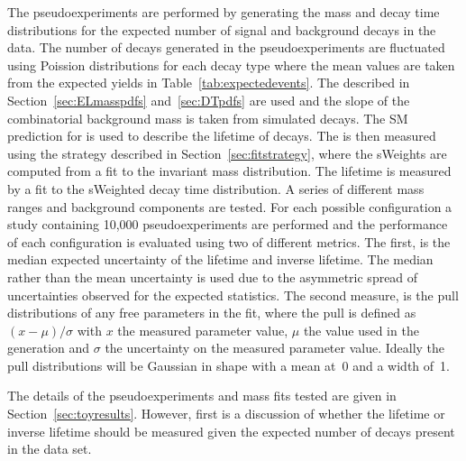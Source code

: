 {The pseudoexperiments are performed by generating the mass and decay time distributions for the expected number of signal and background decays in the data. The number of decays generated in the pseudoexperiments are fluctuated using Poission distributions for each decay type where the mean values are taken from the expected yields in Table~\ref{tab:expectedevents}. The \pdfs described in Section~\ref{sec:ELmasspdfs} and~\ref{sec:DTpdfs} are used and the slope of the combinatorial background mass \pdf is taken from simulated \bbbarmumux decays. The SM prediction for \tmumu is used to describe the lifetime of \bsmumu decays. %
The \el is then measured using the strategy described in Section~\ref{sec:fitstrategy}, where the sWeights are computed from a fit to the invariant mass distribution. The lifetime is measured by a fit to the sWeighted decay time distribution. A series of different mass ranges and background components are tested. For each possible configuration a study containing 10,000 pseudoexperiments are performed and the performance of each configuration is evaluated using two of different metrics. The first, is the median expected uncertainty of the \bsmumu lifetime and inverse lifetime. The median rather than the mean uncertainty is used due to the asymmetric spread of uncertainties observed for the expected statistics. The second measure, is the pull distributions of any free parameters in the fit, where the pull is defined as $(x - \mu)/\sigma$ with $x$ the measured parameter value, $\mu$ the value used in the generation and $\sigma$ the uncertainty on the measured parameter value. Ideally the pull distributions will be Gaussian in shape with a mean at~0 and a width of~1.

 The details of the pseudoexperiments and mass fits tested are given in Section~\ref{sec:toyresults}. However, first is a discussion of whether the lifetime or inverse lifetime should be measured given the expected number of decays present in the data set.  

}
